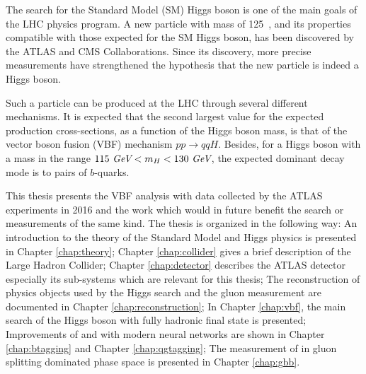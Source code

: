The search for the Standard Model (SM) Higgs boson\cite{Englert:1964et,Higgs:1964pj,Higgs:1964ia,Guralnik:1964eu}  is one of the main goals of the LHC physics program.  A new particle with mass of 125~\gev, and its properties compatible with those expected for the SM Higgs boson, has been discovered by the ATLAS\cite{HIGG-2012-27} and CMS\cite{CMS-HIG-12-028} Collaborations. Since its discovery, more precise measurements have strengthened the hypothesis that the new particle is indeed a Higgs boson\cite{HIGG-2013-02,HIGG-2014-06,HIGG-2014-14,CMS-HIG-12-036,CMS-HIG-12-041}.

Such a particle can be produced at the LHC through several different mechanisms. It is expected that the second largest value for the expected production cross-sections\cite{Dittmaier:2011ti}, as a function of the Higgs boson mass, is that of the vector boson fusion (VBF) mechanism $pp\to qqH$. Besides, for a Higgs boson with a mass in the range $115~\textit{GeV} < m_{H} < 130~\textit{GeV}$, the expected dominant decay mode is to pairs of $b$-quarks.

This thesis presents the VBF \Hbb analysis with data collected by the ATLAS experiments in 2016 and the work which would in future benefit the search or measurements of the same kind. The thesis is organized in the following way: An introduction to the theory of the Standard Model and Higgs physics is presented in Chapter \ref{chap:theory}; Chapter \ref{chap:collider} gives a brief description of the Large Hadron Collider; Chapter \ref{chap:detector} describes the ATLAS detector especially its sub-systems which are relevant for this thesis; The reconstruction of physics objects used by the Higgs search and the gluon measurement are documented in Chapter \ref{chap:reconstruction}; In Chapter \ref{chap:vbf}, the main search of the Higgs boson with fully hadronic final state is presented; Improvements of \btagging and \qgtagging with modern neural networks are shown in Chapter \ref{chap:btagging} and Chapter \ref{chap:qgtagging}; The measurement of \gbb in gluon splitting dominated phase space is presented in Chapter \ref{chap:gbb}.
